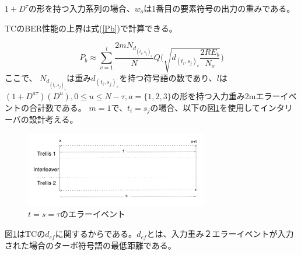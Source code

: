 \documentclass[twoside]{jarticle}
\begin{document}
$1+D^\tau$の形を持つ入力系列の場合、$w_o$は1番目の要素符号の出力の重みである。

TCのBER性能の上界は式(\ref{Pb})で計算できる。



 

\begin{equation}
P_b \approx   \sum_{v=1}^{l} \frac{2mN_{d_{(t_i,s_j)_v}}}{N}Q\Bigg( \sqrt{d_{(t_i,s_j)_v}\frac{2RE_b}{N_o}}\Bigg)
\label{Pb}
\end{equation}
ここで、 $N_{d_{(t_i,s_j)_v}}$は重み$d_{(t_i,s_j)_v}$を持つ符号語の数であり、$l$は$(1+D^{a\tau})(D^u) ,0\leq u\leq N-\tau, a=\{1,2,3\}$の形を持つ入力重み2mエラーイベントの合計数である。
$m=1$で、$t_i=s_j$の場合、以下の図\ref{2_error}を使用してインタリーバの設計考える。
\begin{center}
\begin{figure}[h!]
\includegraphics[width=8cm]{weight2.jpg}
\caption{$t=s=\tau$のエラーイベント}
\label{2_error}
\end{figure}
\end{center}
図\ref{2_error}はTCの$d_{ef}$に関するからである。$d_{ef}$とは、入力重み２エラーイベントが入力された場合のターボ符号語の最低距離である。
\vspace{-3mm}
\end{document}

